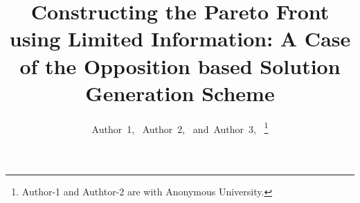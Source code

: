 \documentclass[journal]{IEEEtran}
\newcommand{\papertitle}{Constructing the Pareto Front using Limited Information: A Case of the Opposition based Solution Generation Scheme}
\begin{document}
%
\title{\papertitle}
%
%
%

\author{Author~1,~
        Author~2,~
        and~Author~3,~%
\thanks{Author-1 and Authtor-2 are with Anonymous University.}%
}

% 
%
\end{document}
